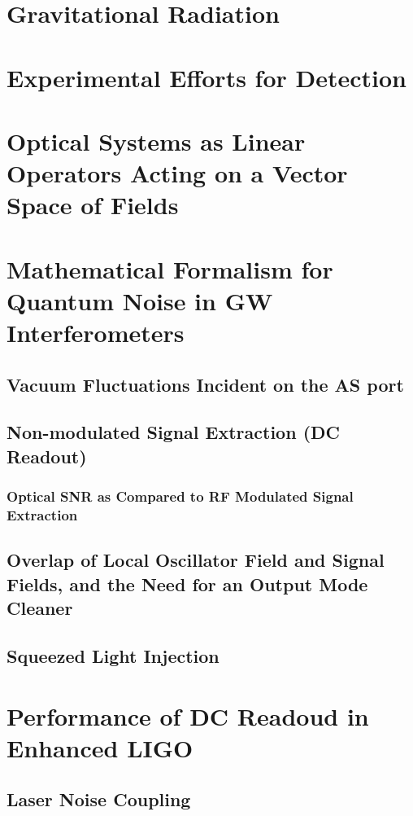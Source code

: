 \documentclass[12pt,vi,twoside]{mitthesis}
\begin{document}

\pagestyle{plain}

%


\chapter{Gravitational Radiation}

\chapter{Experimental Efforts for Detection}

\chapter{Optical Systems as Linear Operators Acting on a Vector Space of Fields}

\chapter{Mathematical Formalism for Quantum Noise in GW Interferometers}
\section{Vacuum Fluctuations Incident on the AS port}
\section{Non-modulated Signal Extraction (DC Readout)}
\subsection{Optical SNR as Compared to RF Modulated Signal Extraction}
\section{Overlap of Local Oscillator Field and Signal Fields, and the Need for an Output Mode Cleaner}
\section{Squeezed Light Injection}

\chapter{Performance of DC Readoud in Enhanced LIGO}
\section{Laser Noise Coupling}
\end{document}
